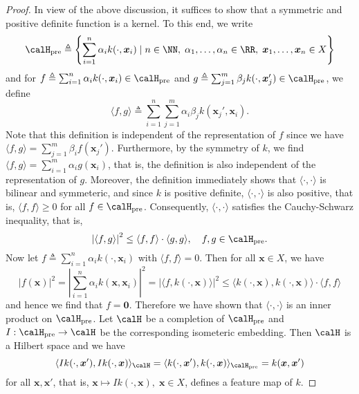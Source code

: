 \begin{proof}
    In view of the above discussion, it suffices to show that a symmetric and positive definite function is a kernel. To this end, we write
    \begin{equation*}
        \calH_{\text{pre}} \triangleq \left\{ \sum_{i=1}^{n} \alpha_{i} k (\cdot , \bm{x}_{i}) \mid n \in \NN , \; \alpha_1 , \ldots , \alpha_n \in \RR , \; \bm{x}_{1} , \ldots , \bm{x}_{n} \in X \right\}
    \end{equation*}
    and for $f \triangleq \sum_{i=1}^{n} \alpha_{i} k (\cdot , \bm{x}_{i}) \in \calH_{\text{pre}}$ and $g \triangleq \sum_{j=1}^{m} \beta_{j} k (\cdot , \bm{x}_{j}') \in \calH_{\text{pre}}$, we define
    \begin{equation*}
        \langle f,g \rangle \triangleq \sum_{i=1}^{n} \sum_{j=1}^{m} \alpha_{i} \beta_{j} k (\bm{x}_{j}' , \bm{x}_{i}).
    \end{equation*}
    Note that this definition is independent of the representation of $f$ since we have $\langle f,g \rangle = \sum_{j=1}^{m} \beta_{i}  f (\bm{x}_{j}')$. Furthermore, by the symmetry of $k$, we find $\langle f,g \rangle = \sum_{i=1}^{m} \alpha_{i}  g (\bm{x}_{i})$, that is, the definition is also independent of the representation of $g$. Moreover, the definition immediately shows that $\langle \cdot , \cdot \rangle$ is bilinear and symmeteric, and since $k$ is positive definite, $\langle \cdot , \cdot \rangle$ is also positive, that is, $\langle f , f \rangle \geq 0$ for all $f \in \calH_{\text{pre}}$. Consequently, $\langle \cdot , \cdot \rangle$ satisfies the Cauchy-Schwarz inequality, that is,
    \begin{equation*}
        \left| \langle f,g \rangle \right|^2 \leq \langle f , f \rangle \cdot \langle g , g \rangle, \quad f,g \in \calH_{\text{pre}}.
    \end{equation*}
    Now let $f \triangleq \sum_{i=1}^{n} \alpha_{i} k (\cdot , \bm{x}_{i})$ with $\langle f , f \rangle = 0$. Then for all $\bm{x} \in X$, we have
    \begin{equation*}
        \left| f(\bm{x}) \right|^2 = \left| \sum_{i=1}^{n} \alpha_i k (\bm{x} , \bm{x}_i) \right|^2 = \left| \langle f , k (\cdot , \bm{x}) \rangle \right|^2 \leq  \langle k (\cdot , \bm{x}) , k (\cdot , \bm{x}) \rangle \cdot \langle f , f \rangle
    \end{equation*}
    and hence we find that $f = \bm{0}$. Therefore we have shown that $\langle \cdot , \cdot \rangle$ is an inner product on $\calH_{\text{pre}}$. Let $\calH$ be a completion of $\calH_{\text{pre}}$ and $I : \calH_{\text{pre}} \to \calH$ be the corresponding isometeric embedding. Then $\calH$ is a Hilbert space and we have
    \begin{equation*}
        \langle I k (\cdot , \bm{x}') , I k (\cdot , \bm{x}) \rangle_{\calH} = \langle k (\cdot , \bm{x}') , k (\cdot , \bm{x}) \rangle_{\calH_{\text{pre}}} = k (\bm{x} , \bm{x}')
    \end{equation*}
    for all $\bm{x} , \bm{x}'$, that is, $\bm{x} \mapsto I k (\cdot , \bm{x}), \; \bm{x} \in X$, defines a feature map of $k$.
\end{proof}